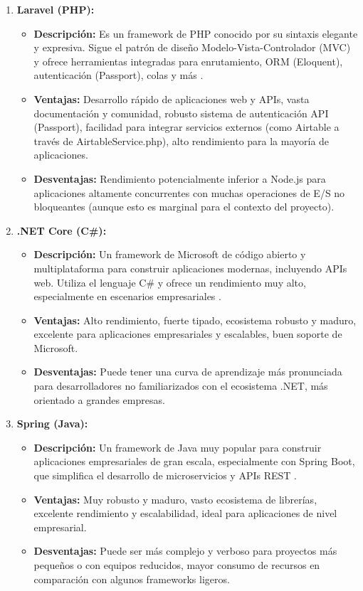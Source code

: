 \begin{enumerate}

    \item \textbf{Laravel (PHP):}
    \begin{itemize}
        \item \textbf{Descripción:} Es un framework de PHP conocido por su sintaxis elegante y expresiva. Sigue el patrón de diseño Modelo-Vista-Controlador (MVC) y ofrece herramientas integradas para enrutamiento, ORM (Eloquent), autenticación (Passport), colas y más \cite{back4app2024backend}.
        \item \textbf{Ventajas:} Desarrollo rápido de aplicaciones web y APIs, vasta documentación y comunidad, robusto sistema de autenticación API (Passport), facilidad para integrar servicios externos (como Airtable a través de AirtableService.php), alto rendimiento para la mayoría de aplicaciones.
        \item \textbf{Desventajas:} Rendimiento potencialmente inferior a Node.js para aplicaciones altamente concurrentes con muchas operaciones de E/S no bloqueantes (aunque esto es marginal para el contexto del proyecto).
    \end{itemize}

    \item \textbf{.NET Core (C\#):}
    \begin{itemize}
        \item \textbf{Descripción:} Un framework de Microsoft de código abierto y multiplataforma para construir aplicaciones modernas, incluyendo APIs web. Utiliza el lenguaje C\# y ofrece un rendimiento muy alto, especialmente en escenarios empresariales \cite{back4app2024backend}.
        \item \textbf{Ventajas:} Alto rendimiento, fuerte tipado, ecosistema robusto y maduro, excelente para aplicaciones empresariales y escalables, buen soporte de Microsoft.
        \item \textbf{Desventajas:} Puede tener una curva de aprendizaje más pronunciada para desarrolladores no familiarizados con el ecosistema .NET, más orientado a grandes empresas.
    \end{itemize}

    \item \textbf{Spring (Java):}
    \begin{itemize}
        \item \textbf{Descripción:} Un framework de Java muy popular para construir aplicaciones empresariales de gran escala, especialmente con Spring Boot, que simplifica el desarrollo de microservicios y APIs REST \cite{back4app2024backend}.
        \item \textbf{Ventajas:} Muy robusto y maduro, vasto ecosistema de librerías, excelente rendimiento y escalabilidad, ideal para aplicaciones de nivel empresarial.
        \item \textbf{Desventajas:} Puede ser más complejo y verboso para proyectos más pequeños o con equipos reducidos, mayor consumo de recursos en comparación con algunos frameworks ligeros.
    \end{itemize}


\end{enumerate}
